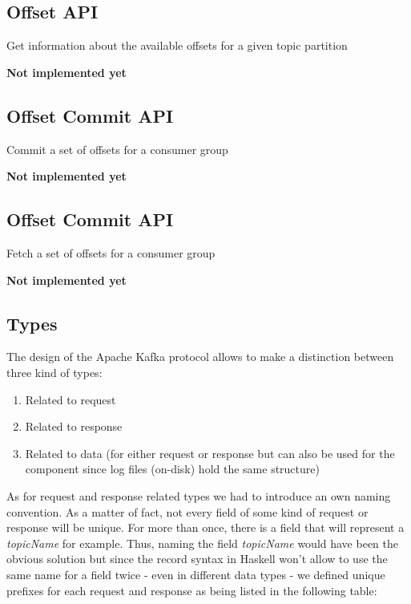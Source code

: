 \subsection{Offset API}
Get information about the available offsets for a given topic partition

\textbf{Not implemented yet}

\subsection{Offset Commit API}
Commit a set of offsets for a consumer group

\textbf{Not implemented yet}

\subsection{Offset Commit API}
Fetch a set of offsets for a consumer group

\textbf{Not implemented yet}

\subsection{Types}

The design of the Apache Kafka protocol allows to make a distinction between three kind of types:
\begin{enumerate}
  \item Related to request
  \item Related to response
  \item Related to data (for either request or response but can also be used for the  component since log files (on-disk) hold the same structure)
\end{enumerate}

As for request and response related types we had to introduce an own naming
convention. As a matter of fact, not every field of some kind of request or
response will be unique. For more than once, there is a field that will
represent a \textit{topicName} for example. Thus, naming the field \textit{
topicName} would have been the obvious solution but since the record syntax in
Haskell won't allow to use the same name for a field twice - even in different
data types - we defined unique prefixes for each request and response as being
listed in the following table:

